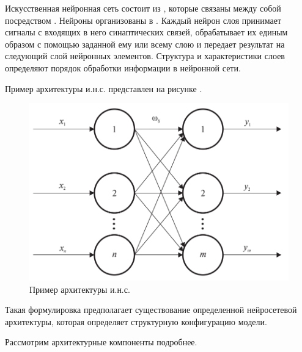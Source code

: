 Искусственная нейронная сеть состоит из , которые связаны между собой посредством . Нейроны организованы в . Каждый нейрон слоя принимает сигналы с входящих в него синаптических связей, обрабатывает их единым образом с помощью заданной ему или всему слою  и передает результат на следующий слой нейронных элементов. Структура и характеристики слоев определяют порядок обработки информации в нейронной сети.

Пример архитектуры и.н.с. представлен на рисунке \textit{}.

\begin{figure}[H]
	\includegraphics[scale=0.3]{author/part3/figures/neural_network.png}
	\caption{Пример архитектуры и.н.с.}
	\label{fig:nn_example}
\end{figure}

	Такая формулировка предполагает существование определенной нейросетевой архитектуры, которая определяет структурную конфигурацию модели.
	
	Рассмотрим архитектурные компоненты подробнее.

\begin{SCn}
\end{SCn}

